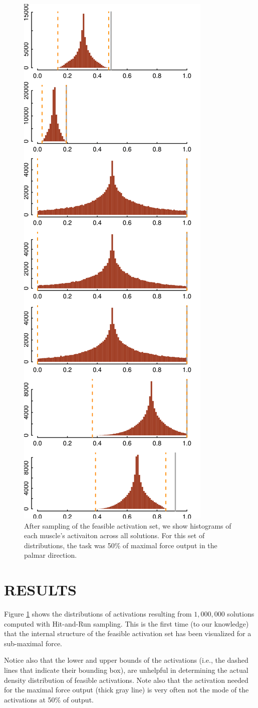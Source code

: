 \begin{figure}[htbp]
\centering
\includegraphics[width=7.5cmh]{sections/figs/raw_histograms.png}
\caption{After sampling of the feasible activation set, we show histograms of each muscle's activaiton across all solutions. For this set of distributions, the task was 50\% of maximal force output in the palmar direction.}
\label{fig:raw_histograms}
\end{figure}


\section{RESULTS}

Figure \ref{fig:raw_histograms} shows the distributions of activations resulting from $1,000,000$ solutions computed with Hit-and-Run sampling. This is the first time (to our knowledge) that the internal structure of the feasible activation set has been visualized for a sub-maximal force.

Notice also that the lower and upper bounds of the activations (i.e., the dashed lines that indicate their bounding box), are unhelpful in determining the actual density distribution of feasible activations.
Note also that the activation needed for the maximal force output (thick gray line) is very often not the mode of the activations at 50\% of output.

